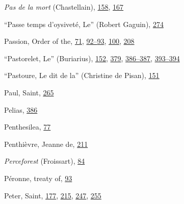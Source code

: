 \emph{Pas de la mort} (Chastellain),
\protect\hyperlink{12_Chapter_Five__THE_VISION_OF_DEAT.xhtmlux5cux23page_158}{158},
\protect\hyperlink{12_Chapter_Five__THE_VISION_OF_DEAT.xhtmlux5cux23page_167}{167}

``Passe temps d'oysiveté, Le'' (Robert Gaguin),
\protect\hyperlink{18_Chapter_Eleven__THE_FORMS_OF_THO.xhtmlux5cux23page_274}{274}

Passion, Order of the,
\protect\hyperlink{10_Chapter_Three__THE_HEROIC_DREAM.xhtmlux5cux23page_71}{71},
\protect\hyperlink{10_Chapter_Three__THE_HEROIC_DREAM.xhtmlux5cux23page_92}{92--}\protect\hyperlink{10_Chapter_Three__THE_HEROIC_DREAM.xhtmlux5cux23page_93}{93},
\protect\hyperlink{10_Chapter_Three__THE_HEROIC_DREAM.xhtmlux5cux23page_100}{100},
\protect\hyperlink{14_Chapter_Seven__THE_PIOUS_PERSONA.xhtmlux5cux23page_208}{208}

``Pastorelet, Le'' (Buriarius),
\protect\hyperlink{11_Chapter_Four__THE_FORMS_OF_LOVE.xhtmlux5cux23page_152}{152},
\protect\hyperlink{21_Chapter_Thirteen__IMAGE_AND_WORD.xhtmlux5cux23page_379}{379},
\protect\hyperlink{22_Chapter_Fourteen__THE_COMING_OF.xhtmlux5cux23page_386}{386--}\protect\hyperlink{22_Chapter_Fourteen__THE_COMING_OF.xhtmlux5cux23page_387}{387},
\protect\hyperlink{22_Chapter_Fourteen__THE_COMING_OF.xhtmlux5cux23page_393}{393--}\protect\hyperlink{22_Chapter_Fourteen__THE_COMING_OF.xhtmlux5cux23page_394}{394}

``Pastoure, Le dit de la'' (Christine de Pisan),
\protect\hyperlink{11_Chapter_Four__THE_FORMS_OF_LOVE.xhtmlux5cux23page_151}{151}

Paul, Saint,
\protect\hyperlink{17_Chapter_Ten__THE_FAILURE_OF_IMAG.xhtmlux5cux23page_265}{265}

Pelias,
\protect\hyperlink{22_Chapter_Fourteen__THE_COMING_OF.xhtmlux5cux23page_386}{386}

Penthesilea,
\protect\hyperlink{10_Chapter_Three__THE_HEROIC_DREAM.xhtmlux5cux23page_77}{77}

Penthièvre, Jeanne de,
\protect\hyperlink{14_Chapter_Seven__THE_PIOUS_PERSONA.xhtmlux5cux23page_211}{211}

\emph{Perceforest} (Froissart),
\protect\hyperlink{10_Chapter_Three__THE_HEROIC_DREAM.xhtmlux5cux23page_84}{84}

Péronne, treaty of,
\protect\hyperlink{10_Chapter_Three__THE_HEROIC_DREAM.xhtmlux5cux23page_93}{93}

Peter, Saint,
\protect\hyperlink{13_Chapter_Six__THE_DEPICTION_OF_TH.xhtmlux5cux23page_177}{177},
\protect\hyperlink{14_Chapter_Seven__THE_PIOUS_PERSONA.xhtmlux5cux23page_215}{215},
\protect\hyperlink{16_Chapter_Nine__THE_DECLINE_OF_SYM.xhtmlux5cux23page_247}{247},
\protect\hyperlink{17_Chapter_Ten__THE_FAILURE_OF_IMAG.xhtmlux5cux23page_255}{255}


